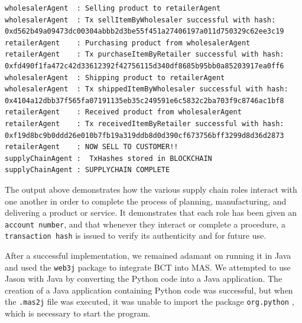 \begin{lstlisting}[numbers=none, basicstyle=\ttfamily\tiny]
wholesalerAgent  : Selling product to retailerAgent
wholesalerAgent  : Tx sellItemByWholesaler successful with hash: 0xd562b49a09473dc00304abbb2d3be55f451a27406197a011d750329c62ee3c19
retailerAgent    : Purchasing product from wholesalerAgent
retailerAgent    : Tx purchaseItemByRetailer successful with hash: 0xfd490f1fa472c42d33612392f42756115d340df8685b95bb0a85203917ea0ff6
wholesalerAgent  : Shipping product to retailerAgent
wholesalerAgent  : Tx shippedItemByWholesaler successful with hash: 0x4104a12dbb37f565fa07191135eb35c249591e6c5832c2ba703f9c8746ac1bf8
retailerAgent    : Received product from wholesalerAgent
retailerAgent    : Tx receivedItemByRetailer successful with hash: 0xf19d8bc9b0ddd26e010b7fb19a319ddb8d0d390cf673756bff3299d8d36d2873
retailerAgent    : NOW SELL TO CUSTOMER!!
supplyChainAgent :  TxHashes stored in BLOCKCHAIN
supplyChainAgent : SUPPLYCHAIN COMPLETE
\end{lstlisting}

\vspace{.5cm}

The output above demonstrates how the various supply chain roles interact with one another in order to complete the process of planning, manufacturing, and delivering a product or service. It demonstrates that each role has been given an \texttt{account number}, and that whenever they interact or complete a procedure, a \texttt{transaction hash} is issued to verify its authenticity and for future use.

\vspace{.5cm}

After a successful implementation, we remained adamant on running it in Java and used the \texttt{web3j} package to integrate \ac{BCT} into \ac{MAS}. We attempted to use Jason with Java by converting the Python code into a Java application. The creation of a Java application containing Python code was successful, but when the \texttt{.mas2j} file was executed, it was unable to import the package \texttt{org.python} , which is necessary to start the program.